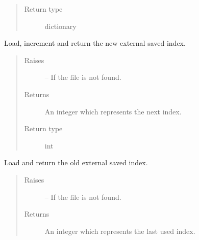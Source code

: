 \documentclass[letterpaper,10pt,english]{sphinxmanual}
\begin{document}
\begin{fulllineitems}
\begin{fulllineitems}
\begin{quote}
\begin{description}
\item[{Return type}] \leavevmode
dictionary

\end{description}\end{quote}

\end{fulllineitems}


\begin{fulllineitems}
\label{\detokenize{index:dataset.dataset_cuboids.increment_index}}
Load, increment and return the new external saved index.
\begin{quote}\begin{description}
\item[{Raises}] \leavevmode
{} -- If the file  is not found.

\item[{Returns}] \leavevmode
An integer which represents the next index.

\item[{Return type}] \leavevmode
int

\end{description}\end{quote}

\end{fulllineitems}


\begin{fulllineitems}
\label{\detokenize{index:dataset.dataset_cuboids.load_index}}
Load and return the old external saved index.
\begin{quote}\begin{description}
\item[{Raises}] \leavevmode
{} -- If the file  is not found.

\item[{Returns}] \leavevmode
An integer which represents the last used index.


\end{description}
\end{quote}
\end{fulllineitems}
\end{fulllineitems}
\end{document}
